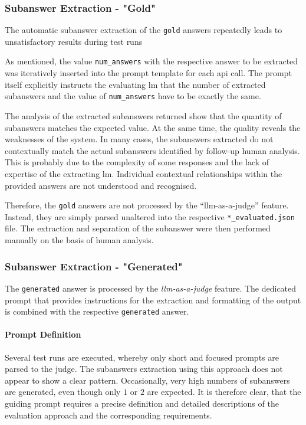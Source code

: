 \subsubsection{Subanswer Extraction - "Gold" }
The automatic subanswer extraction of the \texttt{gold} answers repeatedly leads to unsatisfactory results during test runs

As mentioned, the value \texttt{num\_answers} with the respective answer to be extracted was iteratively inserted into the prompt template for each \ac{api} call.
The prompt itself explicitly instructs the evaluating \ac{lm} that the number of extracted subanswers and the value of \texttt{num\_answers} have to be exactly the same.

The analysis of the extracted subanswers returned show that the quantity of subanswers matches the expected value.
At the same time, the quality reveals the weaknesses of the system.
In many cases, the subanswers extracted do not contextually match the actual subanswers identified by follow-up human analysis.
This is probably due to the complexity of some responses and the lack of expertise of the extracting \ac{lm}. 
Individual contextual relationships within the provided answers are not understood and recognised.

Therefore, the \texttt{gold} answers are not processed by the \enquote{llm-as-a-judge} feature.
Instead, they are simply parsed unaltered into the respective \texttt{*\_evaluated.json} file.
The extraction and separation of the subanswer were then performed manually on the basis of human analysis.
%
\subsubsection{Subanswer Extraction - "Generated"}

The \texttt{generated} answer is processed by the \textit{llm-as-a-judge} feature.
The dedicated prompt that provides instructions for the extraction and formatting of the output is combined with the respective \texttt{generated} answer.
%
\paragraph{Prompt Definition}\label{par:prompt_definition-Step1}

Several test runs are executed, whereby only short and focused prompts are parsed to the judge.
The subanswers extraction using this approach does not appear to show a clear pattern.
Occasionally, very high numbers of subanswers are generated, even though only $1$ or $2$ are expected.
It is therefore clear, that the guiding prompt requires a precise definition and detailed descriptions of the evaluation approach and the corresponding requirements.

